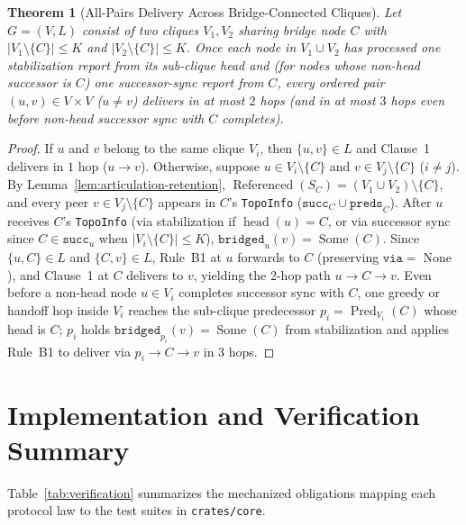 \documentclass[journal]{IEEEtran}
\newtheorem{theorem}{Theorem}
\newcommand{\Pred}{\operatorname{Pred}}
\newcommand{\Head}{\operatorname{head}}
\newcommand{\Referenced}{\operatorname{Referenced}}
\begin{document}
\begin{theorem}[All-Pairs Delivery Across Bridge-Connected Cliques]
\label{theorem:all-pairs}
Let $G = (V, L)$ consist of two cliques $V_1, V_2$ sharing bridge node $C$ with
$|V_1 \setminus \{C\}| \le K$ and $|V_2 \setminus \{C\}| \le K$. Once each node
in $V_1 \cup V_2$ has processed one stabilization report from its sub-clique
head and (for nodes whose non-head successor is $C$) one successor-sync report
from $C$, every ordered pair $(u, v) \in V \times V$ ($u \neq v$) delivers in at
most $2$ hops (and in at most $3$ hops even before non-head successor sync with
$C$ completes).
\end{theorem}
\begin{proof}
If $u$ and $v$ belong to the same clique $V_i$, then $\{u, v\} \in L$ and
Clause~1 delivers in $1$ hop ($u \to v$). Otherwise, suppose $u \in V_i \setminus
\{C\}$ and $v \in V_j \setminus \{C\}$ ($i \neq j$). By
Lemma~\ref{lem:articulation-retention}, $\Referenced(S_C) = (V_1 \cup V_2)
\setminus \{C\}$, and every peer $v \in V_j \setminus \{C\}$ appears in $C$'s
\texttt{TopoInfo} ($\texttt{succ}_C \cup \texttt{preds}_C$). After $u$ receives
$C$'s \texttt{TopoInfo} (via stabilization if $\Head(u) = C$, or via successor
sync since $C \in \texttt{succ}_u$ when $|V_i \setminus \{C\}| \le K$),
$\texttt{bridged}_u(v) = \operatorname{Some}(C)$. Since $\{u, C\} \in L$ and
$\{C, v\} \in L$, Rule~B1 at $u$ forwards to $C$ (preserving
$\texttt{via} = \operatorname{None}$), and Clause~1 at $C$ delivers to $v$,
yielding the 2-hop path $u \to C \to v$. Even before a non-head node $u \in V_i$
completes successor sync with $C$, one greedy or handoff hop inside $V_i$
reaches the sub-clique predecessor $p_i = \Pred_{V_i}(C)$ whose head is $C$;
$p_i$ holds $\texttt{bridged}_{p_i}(v) = \operatorname{Some}(C)$ from
stabilization and applies Rule~B1 to deliver via $p_i \to C \to v$ in $3$ hops.
\end{proof}

\section{Implementation and Verification Summary}

Table~\ref{tab:verification} summarizes the mechanized obligations mapping each
protocol law to the test suites in \texttt{crates/core}.
\end{document}
